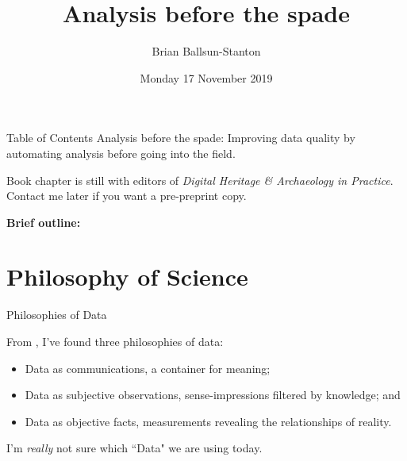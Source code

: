 \documentclass[aspectratio=1610, 11pt]{beamer} %
\title{Analysis before the spade} %
\author{Brian Ballsun-Stanton}               %
\institute{Faculty of Arts}         %
\date{Monday 17 November 2019}                 %
\begin{document}

\maketitle

  

\begin{frame}{Table of Contents}
Analysis before the spade: Improving data quality by automating
analysis before going into the field.

Book chapter is still with editors of \textit{Digital Heritage \& Archaeology in Practice}. Contact me later if you want a pre-preprint copy.

\textbf{Brief outline:}

  \tableofcontents
\end{frame}


\section{Philosophy of Science}

\begin{frame}{Philosophies of Data}

From \cite{Ballsun-Stanton2010-cn}, I've found three philosophies of data:

\begin{itemize}[label=\textbullet]
\item Data as communications, a container for meaning; 
\item Data as subjective observations, sense-impressions filtered by knowledge; and 
\item Data as objective facts, measurements revealing the
relationships of reality.
\end{itemize}

I'm \textit{really} not sure which ``Data" we are using today.
\end{frame}
\end{document}
